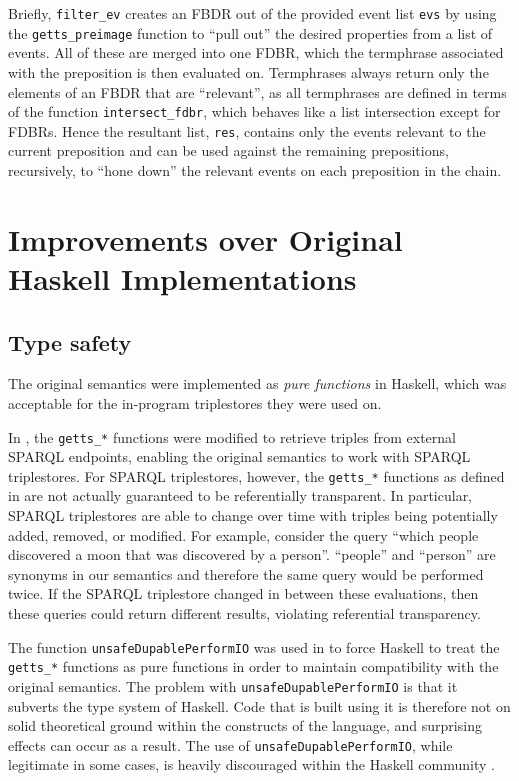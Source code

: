 \documentclass[../main.tex]{subfiles}
\begin{document}
Briefly, \texttt{filter\_ev} creates an FBDR out of the provided event list \texttt{evs} by using the \texttt{getts\_preimage} function
to ``pull out'' the desired properties from a list of events.  All of these are merged into one FDBR,
which the termphrase associated with the preposition is then evaluated on.  Termphrases always return only the elements of an FBDR that are ``relevant'',
as all termphrases are defined in terms of the function \texttt{intersect\_fdbr}, which behaves like a list intersection except for FDBRs.
Hence the resultant list, \texttt{res}, contains only the events relevant to the current preposition and can be used against the remaining prepositions, recursively, to ``hone down'' the relevant events on each preposition in the chain.

\section{Improvements over Original Haskell Implementations}

\subsection{Type safety}

The original semantics were implemented as {\em pure functions} in Haskell, which was acceptable for the in-program triplestores they were used on.

In \cite{agboola2015extensible}, the \texttt{getts\_*} functions were modified to retrieve triples from external SPARQL endpoints, enabling the original
semantics to work with SPARQL triplestores.  For SPARQL triplestores, however, the \texttt{getts\_*} functions as defined in \cite{agboola2015extensible} are not actually guaranteed to be referentially transparent. In particular, SPARQL triplestores are able to change over time with triples being potentially added, removed, or modified.
For example, consider the query ``which people discovered a moon that was discovered by a person''.
``people'' and ``person'' are synonyms in our semantics and therefore the same query would be performed twice.  If the SPARQL triplestore changed in between these evaluations,
then these queries could return different results, violating referential transparency.

The function \texttt{unsafeDupablePerformIO} was used in \cite{agboola2015extensible} to force Haskell to treat the \texttt{getts\_*} functions as pure functions
in order to maintain compatibility with the original semantics. The problem with \texttt{unsafeDupablePerformIO} is that it subverts the type system of Haskell.  Code that is built using it is therefore not on
solid theoretical ground within the constructs of the language, and surprising effects can occur as a result.  The use of \texttt{unsafeDupablePerformIO}, while
legitimate in some cases, is heavily discouraged within the Haskell community \cite{noUnsafePerformIO}.
\end{document}
